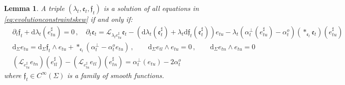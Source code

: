 \documentclass[10pt,reqno,a4paper]{amsart}
\theoremstyle{plain}
\newtheorem{lemma}[thm]{Lemma}
\theoremstyle{definition}
\theoremstyle{remark}
\theoremstyle{remark}
\def\dd{\mathrm{d}}
\def\cL{\mathcal{L}}
\def\cL{\mathcal{L}}
\def\fre{\mathfrak{e}}
\renewcommand{\(}{ (}
\renewcommand{\)}{ )}
\newcommand{\frf}{\mathfrak{f}}
\begin{document}
\begin{lemma}
\label{lemma:refor2}
 A triple $(\lambda_t,\fre_t,\frf_t)$ is a solution of all equations in \eqref{eq:evolutionconstraintskew} if and only if:
 \begin{eqnarray}
 & \partial_t \frf_t + \dd\lambda_t(e_{tu}^{\sharp}) = 0\, , \quad \partial_t \fre_t= \mathcal{L}_{\lambda_t e^{\sharp}_{tu}} \fre_t - (\dd\lambda_t(\fre_t^{\sharp}) + \lambda_t \dd\frf_t(\fre_t^{\sharp}) ) e_{tu} - \lambda_t (\alpha^{\perp}_t (e^{\sharp}_{tu}) - \alpha^o_t) ( \ast_{\fre_t} \fre_t)(e^{\sharp}_{tu} ) \nonumber  \\   
& \dd_{\Sigma} e_{tu} = \dd_{\Sigma}\frf_t \wedge e_{tu} + \ast_{\fre_t} (\alpha^{\perp}_t   - \alpha^o_t e_{tu})  \, , \qquad \dd_{\Sigma} e_{tl} \wedge e_{tu} = 0 \, , \qquad \dd_{\Sigma} e_{tn} \wedge e_{tu} = 0 \label{eq:evolutionconstraintII} \\
& (\cL_{e_{tu}^{\sharp}}e_{tn})(e_{tl}^{\sharp}) - (\cL_{e_{tu}^{\sharp}}e_{tl})(e_{tn}^{\sharp}) = \alpha^{\perp}_t(e_{tu}) - 2\alpha^o_t\nonumber
\end{eqnarray}
 where $\frf_t\in C^{\infty}(\Sigma)$ is a family of smooth functions.
\end{lemma}
\end{document}
